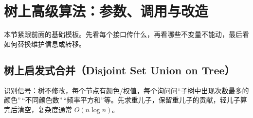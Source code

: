 \section{树上高级算法：参数、调用与改造}

本节紧跟前面的基础模板。先看每个接口传什么，再看哪些不变量不能动，最后看如何替换维护信息或转移。

\subsection{树上启发式合并（Disjoint Set Union on Tree）}

识别信号：树不修改，每个节点有颜色/权值，每个询问问``子树中出现次数最多的颜色''\,``不同颜色数''\,``频率平方和''等。先求重儿子，保留重儿子的贡献，轻儿子算完后清空，复杂度通常 \(O(n\log n)\)。

